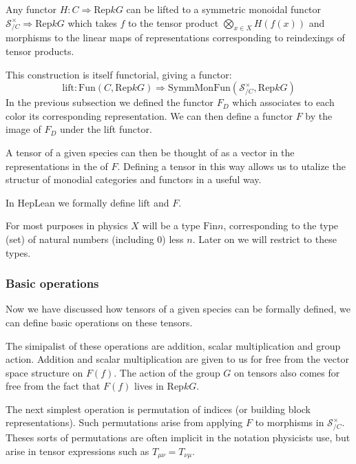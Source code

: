 \documentclass[a4paper, 11pt]{article}
\begin{document}
Any functor $H : C \Rightarrow \mathrm{Rep} k G$ can be lifted to a symmetric monoidal 
functor $\mathcal{S}_{/C}^\times \Rightarrow \mathrm{Rep} k G$ which takes $f$ to the 
tensor product $\bigotimes_{x \in X} H(f(x))$ and morphisms to the linear maps 
of representations corresponding to reindexings of
tensor products.

This construction is itself functorial, 
giving a functor: 
\begin{equation}
  \mathrm{lift} : \mathrm{Fun}(C, \mathrm{Rep} k G) \Rightarrow
  \mathrm{SymmMonFun}(\mathcal{S}_{/C}^\times, \mathrm{Rep} k G)
\end{equation} 
In the previous subsection we defined the functor $F_{D}$ which associates to each color 
its corresponding representation. We can then define a functor $F$ by the image of $F_{D}$ under
the lift functor. 

A tensor of a given species can then be thought of as a vector in the representations in the of $F$.
Defining a tensor in this way allows us to utalize the 
structur of monodial categories and functors in a useful way. 

In HepLean we formally define $\mathrm{lift}$ and $F$. 

For most purposes in physics $X$ will be a type $\mathrm{Fin} n$, corresponding to the type 
(set) of natural numbers (including 0) less $n$. Later on we will restrict to these types.

\subsubsection{Basic operations}

Now we have discussed how tensors of a given species can be formally defined, we can define 
basic operations on these tensors. 


The simipalist of these operations are addition, scalar multiplication and group action.
Addition and scalar multiplication are given to us for free from the vector space structure 
on $F(f)$. The action of the group $G$ on tensors also comes for free from the fact that 
$F(f)$ lives in $\mathrm{Rep} k G$.

The next simplest operation is permutation of indices (or building block representations).
Such permutations arise from applying $F$ to morphisms in $\mathcal{S}_{/C}^\times$. 
Theses sorts of permutations are often implicit in the notation physicists use, but arise 
in tensor expressions such as $T_{\mu \nu} = T_{\nu \mu}$.
\end{document}
